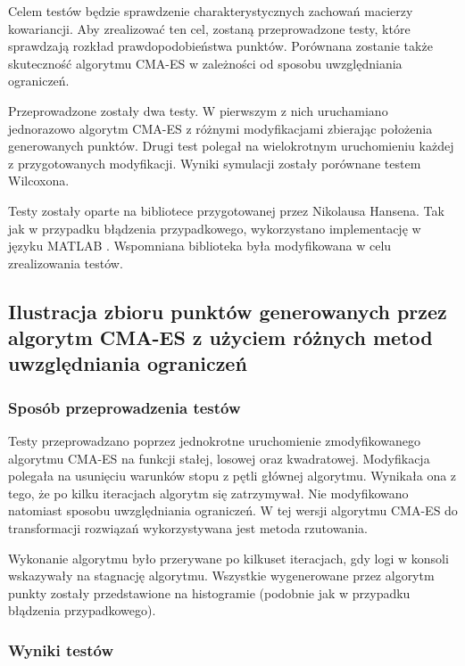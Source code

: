 \documentclass{mini}
\begin{document}
Celem testów będzie sprawdzenie charakterystycznych zachowań macierzy kowariancji. Aby zrealizować ten cel, zostaną przeprowadzone testy, które sprawdzają rozkład prawdopodobieństwa punktów. Porównana zostanie także skuteczność algorytmu CMA-ES w zależności od sposobu uwzględniania ograniczeń.

Przeprowadzone zostały dwa testy. W pierwszym z nich uruchamiano jednorazowo algorytm CMA-ES z różnymi modyfikacjami zbierając położenia generowanych punktów. Drugi test polegał na wielokrotnym uruchomieniu każdej z przygotowanych modyfikacji. Wyniki symulacji zostały porównane testem Wilcoxona.

Testy zostały oparte na bibliotece przygotowanej przez Nikolausa Hansena. Tak jak w przypadku błądzenia przypadkowego, wykorzystano implementację w języku \mbox{MATLAB} \cite{cmaes_code}. Wspomniana biblioteka była modyfikowana w celu zrealizowania testów.

\subsection{Ilustracja zbioru punktów generowanych przez algorytm CMA-ES z użyciem różnych metod uwzględniania ograniczeń}

\subsubsection{Sposób przeprowadzenia testów}
\hspace{3,4ex}Testy przeprowadzano poprzez jednokrotne uruchomienie zmodyfikowanego algorytmu CMA-ES na funkcji stałej, losowej oraz kwadratowej. Modyfikacja polegała na usunięciu warunków stopu z pętli głównej algorytmu. Wynikała ona z tego, że po kilku iteracjach algorytm się zatrzymywał. Nie modyfikowano natomiast sposobu uwzględniania ograniczeń. W tej wersji algorytmu CMA-ES do transformacji rozwiązań wykorzystywana jest metoda rzutowania.

Wykonanie algorytmu było przerywane po kilkuset iteracjach, gdy logi w konsoli wskazywały na stagnację algorytmu. Wszystkie wygenerowane przez algorytm punkty zostały przedstawione na histogramie (podobnie jak w przypadku błądzenia przypadkowego).

\subsubsection{Wyniki testów}
\end{document}
